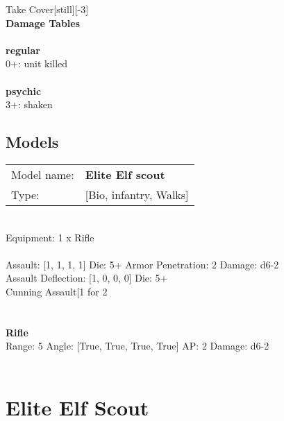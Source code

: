 Take Cover[still][-3]\\ 



{\bf Damage Tables} \\
\ \\ {\bf regular } \\
0+: unit killed \\
\ \\ {\bf psychic } \\
3+: shaken \\


\pagebreak

\subsection{ Models }

\begin{tabular}{ll}
Model name: & {\bf Elite Elf scout } \\
Type: & [Bio, infantry, Walks] \\
\end{tabular}
\ \\
Equipment: 1 x Rifle \\
\ \\
Assault: [1, 1, 1, 1] Die: 5+ Armor Penetration: 2 Damage: d6-2 \\
Assault Deflection: [1, 0, 0, 0] Die: 5+\\
\indent Cunning Assault[1 for 2\\ 
 
\ \\

\ \\
{\bf Rifle } \\



Range: 5  Angle: [True, True, True, True] AP: 2 Damage: d6-2 \\




 
\ \\














\pagebreak\clearpage

\section{ Elite Elf Scout }


